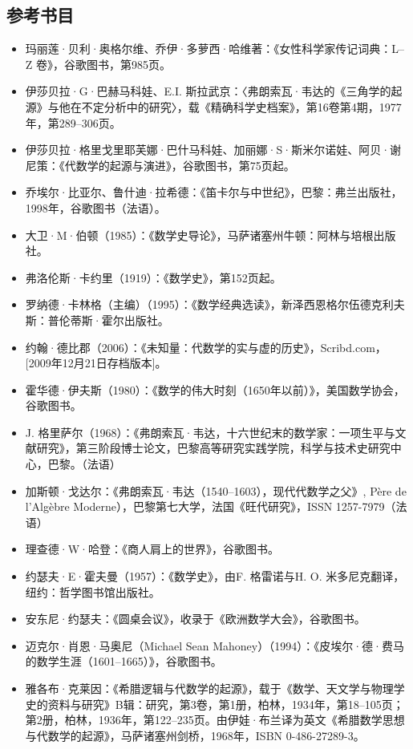 \subsection{参考书目}
\begin{itemize}
\item 玛丽莲·贝利·奥格尔维、乔伊·多萝西·哈维著：《女性科学家传记词典：L–Z 卷》，谷歌图书，第985页。
\item 伊莎贝拉·G·巴赫马科娃、E.I. 斯拉武京：〈弗朗索瓦·韦达的《三角学的起源》与他在不定分析中的研究〉，载《精确科学史档案》，第16卷第4期，1977年，第289–306页。
\item 伊莎贝拉·格里戈里耶芙娜·巴什马科娃、加丽娜·S·斯米尔诺娃、阿贝·谢尼策：《代数学的起源与演进》，谷歌图书，第75页起。
\item 乔埃尔·比亚尔、鲁什迪·拉希德：《笛卡尔与中世纪》，巴黎：弗兰出版社，1998年，谷歌图书（法语）。
\item 大卫·M·伯顿（1985）：《数学史导论》，马萨诸塞州牛顿：阿林与培根出版社。
\item 弗洛伦斯·卡约里（1919）：《数学史》，第152页起。
\item 罗纳德·卡林格（主编）（1995）：《数学经典选读》，新泽西恩格尔伍德克利夫斯：普伦蒂斯·霍尔出版社。
\item 约翰·德比郡（2006）：《未知量：代数学的实与虚的历史》，Scribd.com，[2009年12月21日存档版本]。
\item 霍华德·伊夫斯（1980）：《数学的伟大时刻（1650年以前）》，美国数学协会，谷歌图书。
\item J. 格里萨尔（1968）：《弗朗索瓦·韦达，十六世纪末的数学家：一项生平与文献研究》，第三阶段博士论文，巴黎高等研究实践学院，科学与技术史研究中心，巴黎。（法语）
\item 加斯顿·戈达尔：《弗朗索瓦·韦达（1540–1603），现代代数学之父》, Père de l’Algèbre Moderne），巴黎第七大学，法国《旺代研究》，ISSN 1257-7979（法语）
\item 理查德·W·哈登：《商人肩上的世界》，谷歌图书。
\item 约瑟夫·E·霍夫曼（1957）：《数学史》，由F. 格雷诺与H. O. 米多尼克翻译，纽约：哲学图书馆出版社。
\item 安东尼·约瑟夫：《圆桌会议》，收录于《欧洲数学大会》，谷歌图书。
\item 迈克尔·肖恩·马奥尼（Michael Sean Mahoney）（1994）：《皮埃尔·德·费马的数学生涯（1601–1665）》，谷歌图书。
\item 雅各布·克莱因：《希腊逻辑与代数学的起源》，载于《数学、天文学与物理学史的资料与研究》B辑：研究，第3卷，第1册，柏林，1934年，第18–105页；第2册，柏林，1936年，第122–235页。由伊娃·布兰译为英文《希腊数学思想与代数学的起源》，马萨诸塞州剑桥，1968年，ISBN 0-486-27289-3。

\end{itemize}
